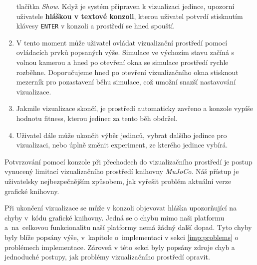 \begin{enumerate}
        tlačítka \emph{Show}. Když je systém připraven k vizualizaci jedince,
        upozorní uživatele \textbf{hláškou v textové konzoli}, kterou uživatel
        potvrdí stisknutím klávesy \texttt{ENTER} v konzoli a prostředí se hned
        spouští.
    \item V tento moment může uživatel ovládat vizualizační prostředí pomocí
        ovládacích prvků popsaných výše. Simulace ve výchozím stavu začíná s
        volnou kamerou a hned po otevření okna se simulace prostředí rychle
        rozběhne. Doporučujeme hned po otevření vizualizačního okna stisknout
        mezerník pro pozastavení běhu simulace, což umožní snazší nastavování
        vizualizace. 
    \item Jakmile vizualizace skončí, je prostředí automaticky zavřeno a
        konzole vypíše hodnotu fitness, kterou jedinec za tento běh obdržel.
    \item Uživatel dále může ukončit výběr jedinců, vybrat dalšího jedince pro
        vizualizaci, nebo úplně změnit experiment, ze kterého jedince vybírá.
\end{enumerate}
Potvrzování pomocí konzole při přechodech do vizualizačního prostředí je postup
vynucený limitací vizualizačního prostředí knihovny \emph{MuJoCo}. Náš přístup
je uživatelsky nejbezpečnějším způsobem, jak vyřešit problém aktuální verze
grafické knihovny.

Při ukončení vizualizace se může v konzoli objevovat hláška upozorňující na
chyby v~kódu grafické knihovny. Jedná se o chybu mimo naši platformu
a~na~celkovou funkcionalitu naší platformy nemá žádný další dopad. Tyto chyby
byly blíže popsány výše, v~kapitole o~implementaci v sekci \ref{imp:problems} o
problémech implementace. Zároveň v této sekci byly popsány zdroje chyb a
jednoduché postupy, jak problémy vizualizačního prostředí opravit.
